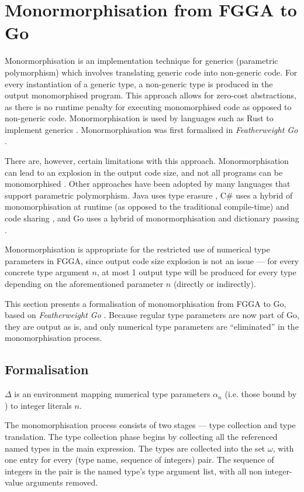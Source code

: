 \section{Monormorphisation from FGGA to Go}
\label{ch:monomo}

Monormorphisation is an implementation technique for generics (parametric
polymorphism) which involves translating generic code into non-generic code. For
every instantiation of a generic type, a non-generic type is produced in the
output monomorphised program. This approach allows for zero-cost abstractions,
as there is no runtime penalty for executing monomorphised code as opposed to
non-generic code. Monormorphisation is used by languages such as Rust to
implement generics \autocite{rustCompilerGuide}. Monormorphisation was first
formalised in \emph{Featherweight Go} \autocite{fg}.

There are, however, certain limitations with this approach. Monormorphisation
can lead to an explosion in the output code size, and not all programs can be
monomorphised \autocite{fg}. Other approaches have been adopted by many
languages that support parametric polymorphism. Java uses type erasure
\autocite{javaSpec}, C\# uses a hybrid of monomorphisation at runtime (as
opposed to the traditional compile-time) and code sharing
\autocite{clrGenerics}, and Go uses a hybrid of monormorphisation and dictionary
passing \autocite{generics1.18}.

Monormorphisation is appropriate for the restricted use of numerical type
parameters in FGGA, since output code size explosion is not an issue --- for
every concrete type argument $n$, at most 1 output type will be produced for
every type depending on the aforementioned parameter $n$ (directly or
indirectly).

This section presents a formalisation of monomorphisation from FGGA to Go, based
on \emph{Featherweight Go} \autocite{fg}. Because regular type parameters are
now part of Go, they are output as is, and only numerical type parameters are
``eliminated'' in the monomorphisation process.

\subsection{Formalisation}

$\Delta$ is an environment mapping numerical type parameters $\alpha_n$ (i.e.
those bound by ) to integer literals $n$.

The monomorphisation process consists of two stages --- type collection and type
translation. The type collection phase begins by collecting all the referenced
named types in the main expression. The types are collected into the set
$\omega$, with one entry for every (type name, sequence of integers) pair. The
sequence of integers in the pair is the named type's type argument list, with
all non integer-value arguments removed.


